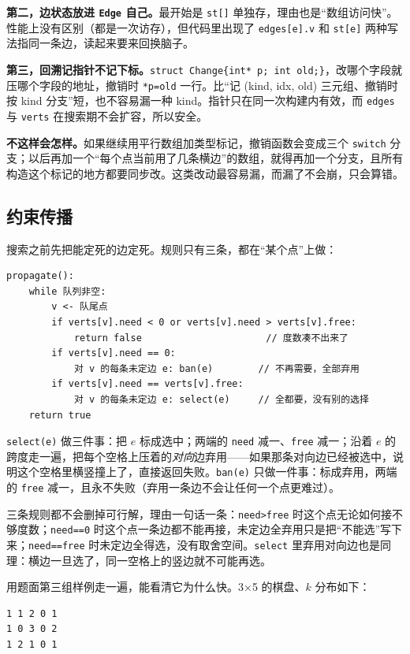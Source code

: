 \documentclass[12pt,a4paper,fontset=windows]{ctexart}
\newcommand{\code}[1]{\texttt{#1}}
\begin{document}
\textbf{第二，边状态放进 \code{Edge} 自己。}最开始是 \code{st[]} 单独存，理由也是“数组访问快”。性能上没有区别（都是一次访存），但代码里出现了 \code{edges[e].v} 和 \code{st[e]} 两种写法指同一条边，读起来要来回换脑子。

\textbf{第三，回溯记指针不记下标。}\code{struct Change\{int* p; int old;\}}，改哪个字段就压哪个字段的地址，撤销时 \code{*p=old} 一行。比“记 (kind, idx, old) 三元组、撤销时按 kind 分支”短，也不容易漏一种 kind。指针只在同一次构建内有效，而 \code{edges} 与 \code{verts} 在搜索期不会扩容，所以安全。

\textbf{不这样会怎样。}如果继续用平行数组加类型标记，撤销函数会变成三个 \code{switch} 分支；以后再加一个“每个点当前用了几条横边”的数组，就得再加一个分支，且所有构造这个标记的地方都要同步改。这类改动最容易漏，而漏了不会崩，只会算错。

\subsection{约束传播}

搜索之前先把能定死的边定死。规则只有三条，都在“某个点”上做：

\begin{lstlisting}
propagate():
    while 队列非空:
        v <- 队尾点
        if verts[v].need < 0 or verts[v].need > verts[v].free:
            return false                      // 度数凑不出来了
        if verts[v].need == 0:
            对 v 的每条未定边 e: ban(e)        // 不再需要，全部弃用
        if verts[v].need == verts[v].free:
            对 v 的每条未定边 e: select(e)     // 全都要，没有别的选择
    return true
\end{lstlisting}

\code{select(e)} 做三件事：把 $e$ 标成选中；两端的 \code{need} 减一、\code{free} 减一；沿着 $e$ 的跨度走一遍，把每个空格上压着的\emph{对向}边弃用——如果那条对向边已经被选中，说明这个空格里横竖撞上了，直接返回失败。\code{ban(e)} 只做一件事：标成弃用，两端的 \code{free} 减一，且永不失败（弃用一条边不会让任何一个点更难过）。

三条规则都不会删掉可行解，理由一句话一条：\code{need>free} 时这个点无论如何接不够度数；\code{need==0} 时这个点一条边都不能再接，未定边全弃用只是把“不能选”写下来；\code{need==free} 时未定边全得选，没有取舍空间。\code{select} 里弃用对向边也是同理：横边一旦选了，同一空格上的竖边就不可能再选。

用题面第三组样例走一遍，能看清它为什么快。3×5 的棋盘、$k$ 分布如下：

\begin{lstlisting}
1 1 2 0 1
1 0 3 0 2
1 2 1 0 1
\end{lstlisting}
\end{document}
